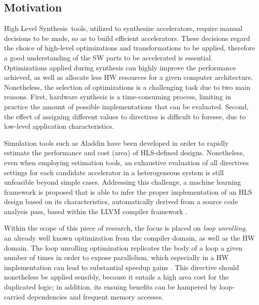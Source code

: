 \documentclass[]{usiinfthesis}
\newcommand{\HLS}{{High Level Synthesis}}
\begin{document}
\subsection{Motivation}

\HLS\ tools, utilized to synthesize accelerators, require manual decisions to be made, so as 
to build efficient accelerators. These decisions regard the choice of high-level optimizations 
and transformations to be applied, therefore a good understanding of the SW parts to be 
accelerated is essential. Optimizations applied during synthesis can highly improve the performance 
achieved, as well as allocate less HW resources for a given computer architecture. Nonetheless, 
the selection of optimizations is a challenging task due to two main reasons. 
First, hardware synthesis is a time-consuming process, limiting in practice the amount of 
possible implementations that can be evaluated. Second, the effect of assigning different values to 
directives is difficult to foresee, due to low-level application characteristics.\par

Simulation tools such as Aladdin \cite{ShaoJul14} have been developed in order to rapidly 
estimate the performance and cost (area) of HLS-defined designs. Nonetheless, even when employing 
estimation tools, an exhaustive evaluation of all directives settings for each candidate accelerator 
in a heterogeneous system is still unfeasible beyond simple cases. Addressing
this challenge, a machine learning framework is proposed that is able to infer the proper 
implementation of an HLS design based on its characteristics, automatically derived from a source code 
analysis pass, based within the LLVM compiler framework \cite{LattnerMar04}.\par


Within the scope of this piece of research, the focus is placed on {\em loop unrolling}, an already 
well known optimization from the compiler domain, as well as the HW domain.
The loop unrolling optimization replicates the body of a loop a given number of times 
in order to expose parallelism, which especially in a HW implementation can lead to 
substantial speedup gains \cite{KurraApr07}. 
This directive should nonetheless be applied sensibly, because it entails a high area cost for the 
duplicated logic; in addition, its ensuing benefits can be hampered by loop-carried dependencies 
and frequent memory accesses.\par
\end{document}
